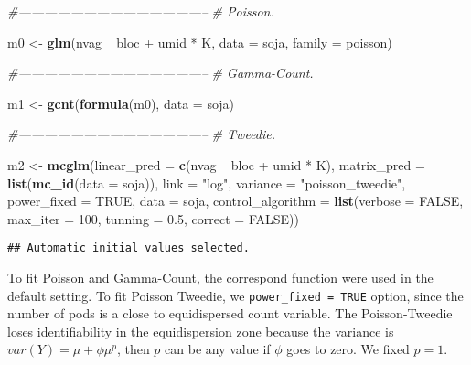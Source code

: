 \documentclass[9pt,a5paper,]{book}
\newenvironment{Shaded}{}{}
\newcommand{\KeywordTok}[1]{\textbf{{#1}}}
\newcommand{\DataTypeTok}[1]{\underline{{#1}}}
\newcommand{\DecValTok}[1]{{#1}}
\newcommand{\FloatTok}[1]{{#1}}
\newcommand{\StringTok}[1]{{#1}}
\newcommand{\CommentTok}[1]{\textit{{#1}}}
\newcommand{\OtherTok}[1]{{#1}}
\newcommand{\NormalTok}[1]{{#1}}
\renewenvironment{Shaded}{\color{inputcolor}}{}
\renewcommand{\DataTypeTok}[1]{{#1}}
\theoremstyle{definition}
\theoremstyle{definition}
\theoremstyle{remark}
\begin{document}
\begin{Shaded}
\begin{Highlighting}[]
\CommentTok{#--------------------------------------------}
\CommentTok{# Poisson.}

\NormalTok{m0 <-}\StringTok{ }\KeywordTok{glm}\NormalTok{(nvag ~}\StringTok{ }\NormalTok{bloc +}\StringTok{ }\NormalTok{umid *}\StringTok{ }\NormalTok{K,}
          \DataTypeTok{data =} \NormalTok{soja,}
          \DataTypeTok{family =} \NormalTok{poisson)}

\CommentTok{#--------------------------------------------}
\CommentTok{# Gamma-Count.}

\NormalTok{m1 <-}\StringTok{ }\KeywordTok{gcnt}\NormalTok{(}\KeywordTok{formula}\NormalTok{(m0), }\DataTypeTok{data =} \NormalTok{soja)}

\CommentTok{#--------------------------------------------}
\CommentTok{# Tweedie.}

\NormalTok{m2 <-}\StringTok{ }\KeywordTok{mcglm}\NormalTok{(}\DataTypeTok{linear_pred =} \KeywordTok{c}\NormalTok{(nvag ~}\StringTok{ }\NormalTok{bloc +}\StringTok{ }\NormalTok{umid *}\StringTok{ }\NormalTok{K),}
            \DataTypeTok{matrix_pred =} \KeywordTok{list}\NormalTok{(}\KeywordTok{mc_id}\NormalTok{(}\DataTypeTok{data =} \NormalTok{soja)),}
            \DataTypeTok{link =} \StringTok{"log"}\NormalTok{,}
            \DataTypeTok{variance =} \StringTok{"poisson_tweedie"}\NormalTok{,}
            \DataTypeTok{power_fixed =} \OtherTok{TRUE}\NormalTok{,}
            \DataTypeTok{data =} \NormalTok{soja,}
            \DataTypeTok{control_algorithm =} \KeywordTok{list}\NormalTok{(}\DataTypeTok{verbose =} \OtherTok{FALSE}\NormalTok{,}
                                     \DataTypeTok{max_iter =} \DecValTok{100}\NormalTok{,}
                                     \DataTypeTok{tunning =} \FloatTok{0.5}\NormalTok{,}
                                     \DataTypeTok{correct =} \OtherTok{FALSE}\NormalTok{))}
\end{Highlighting}
\end{Shaded}

\begin{verbatim}
## Automatic initial values selected.
\end{verbatim}

To fit Poisson and Gamma-Count, the correspond function were used in the
default setting. To fit Poisson Tweedie, we
\texttt{power\_fixed\ =\ TRUE} option, since the number of pods is a
close to equidispersed count variable. The Poisson-Tweedie loses
identifiability in the equidispersion zone because the variance is
\(var(Y) = \mu + \phi\mu^p\), then \(p\) can be any value if \(\phi\)
goes to zero. We fixed \(p = 1\).
\end{document}
